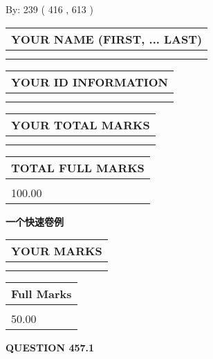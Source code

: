 \documentclass{ctexart}
\begin{document}
   
\hspace{1.0in} By: 
 239 ( 416 ,  613 )
   
   
   
   
\newpage 
\setcounter{page}{ 
   457001 } 
   
   
   
   
\noindent\begin{tabular}{|l|}
\hline
YOUR NAME (FIRST, ... LAST)  \\
\hline
 \\ 
 \\ 
\hline
\end{tabular}
\hspace{0.05in} \begin{tabular}{|l|}
\hline
 YOUR   ID   INFORMATION  \\
\hline
 \\ 
 \\ 
\hline
\end{tabular}
   
   
\vspace{0.2in}\noindent\begin{tabular}{|l|}
\hline
YOUR TOTAL MARKS  \\
\hline
 \\ 
 \\ 
\hline
\end{tabular}
\hspace{0.05in} \begin{tabular}{|l|}
\hline
TOTAL FULL MARKS  \\
\hline
 \\ 
100.00 \\
\hline
\end{tabular}
   
   
 \vspace{0.2in}
{\LARGE {\textbf{ 一个快速卷例}}}
   
   
  
\vspace{0.2in}
  
\noindent\begin{tabular}{|l|}
\hline
 YOUR MARKS  \\
\hline
 \\ 
 \\ 
\hline
\end{tabular}
\hspace{0.05in} \begin{tabular}{|l|}
\hline
 Full Marks  \\
\hline
 \\ 
50.00 \\
\hline
\end{tabular}
{\textbf{\Large{QUESTION
457.1 
}}}
  
\end{document}
